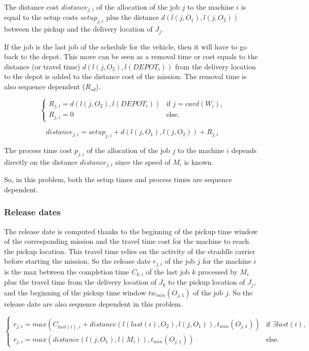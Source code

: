 \documentclass[a4paper,10pt]{article}
\begin{document}
The distance cost $distance_{j, i}$ of the allocation of the job $j$ to the machine $i$ is equal to the setup costs $setup_{j, i}$ plus the distance $d(l(j,O_1), l(j,O_2))$ between the pickup and the delivery location of $J_j$.

If the job is the last job of the schedule for the vehicle, then it will have to go back to the depot. This move can be seen as a removal time or cost equals to the distance (or travel time) $d(l(j,O_2),l(DEPOT_{i}))$ from the delivery location to the depot is added to the distance cost of the mission. The removal time is also sequence dependent ($R_{sd}$).

\begin{equation*}
\begin{cases}
 R_{j, i} = d(l(j,O_2),l(DEPOT_{i})) & \text{if $j = card(W_{i})$,} \\
 R_{j, i} = 0 & \text{else.}
\end{cases}
\end{equation*}

\begin{equation*}
  distance_{j,i} = setup_{j, i} + d(l(j,O_1), l(j,O_2)) + R_{j,i}
\end{equation*}

The process time cost $p_{j, i}$ of the allocation of the job $j$ to the machine $i$ depends directly on the distance $distance_{j,i}$ since the speed of $M_i$ is known.

So, in this problem, both the setup times and process times are sequence dependent.


\subsubsection{Release dates}
The release date is computed thanks to the beginning of the pickup time window of the corresponding mission and the travel time cost for the machine to reach the pickup location. This travel time relies on the activity of the straddle carrier before starting the mission. So the release date $r_{j,i}$ of the job $j$ for the machine $i$ is the max between the completion time $C_{k,i}$ of the last job $k$  processed by $M_i$ plus the travel time from the delivery location of $J_k$ to the pickup location of $J_j$, and the beginning of the pickup time window $tw_{min}(O_{j,1})$ of the job $j$. So the release date are also sequence dependent in this problem.

\begin{equation*}
 \begin{cases}
    r_{j,i} = max(C_{last(i),i} + distance(l(last(i),O_2),l(j,O_1)) , t_{min}(O_{j,1})) & \text{if $\exists last(i)$,}\\
    r_{j,i} = max(distance(l(j,O_1) , l(M_i)) , t_{min}(O_{j,1})) & \text{else.}
\end{cases}
\end{equation*}
\end{document}
